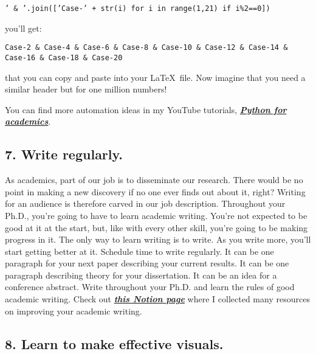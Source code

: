 \documentclass[10pt,twocolumn]{article}
\begin{document}
\texttt{' \& '.join(['Case-' + str(i) for i in range(1,21) if i\%2==0])}

you’ll get:

\texttt{Case-2 \& Case-4 \& Case-6 \& Case-8 \& Case-10 \& Case-12 \& Case-14 \& Case-16 \& Case-18 \& Case-20}

that you can copy and paste into your \LaTeX\  file. Now imagine that you need a similar header but for one million numbers!

You can find more automation ideas in my YouTube tutorials, \href{https://www.youtube.com/playlist?list=PL7gWbAt3_3KEuRQfwFeI_RH3EZr87nslf}{\textcolor{deepblue}{\textbf{\textit{Python for academics}}}}.

\subsection*{7. Write regularly.}

As academics, part of our job is to disseminate our research. There would be no point in making a new discovery if no one ever finds out about it, right? Writing for an audience is therefore carved in our job description. Throughout your Ph.D., you’re going to have to learn academic writing. You’re not expected to be good at it at the start, but, like with every other skill, you’re going to be making progress in it. The only way to learn writing is to write. As you write more, you’ll start getting better at it. Schedule time to write regularly. It can be one paragraph for your next paper describing your current results. It can be one paragraph describing theory for your dissertation. It can be an idea for a conference abstract. Write throughout your Ph.D. and learn the rules of good academic writing. Check out \href{https://kamilazdybal.notion.site/Improving-your-academic-writing-42da2498f8f14e3a9c9e20a068cbe472}{\textcolor{deepblue}{\textbf{\textit{this Notion page}}}} where I collected many resources on improving your academic writing.

\subsection*{8. Learn to make effective visuals.}
\end{document}
